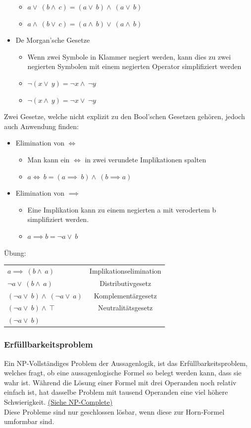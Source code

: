 \documentclass{article}
\begin{document}
\begin{itemize}
\begin{itemize}
				\item{$a \lor\ (b \land\ c) = (a\lor\ b) \land\ (a \lor\ b)$}
				\item{$a \land\ (b \lor\ c) = (a\land\ b) \lor\ (a \land\ b)$}
			\end{itemize}
			\item{De Morgan'sche Gesetze}
			\begin{itemize}
				\item{Wenn zwei Symbole in Klammer negiert werden, kann dies zu zwei negierten Symbolen mit einem negierten Operator simplifiziert werden}
				\item{$\neg (x \lor\ y) = \neg x \land\ \neg y$}
				\item{$\neg (x \land\ y) = \neg x \lor\ \neg y$}
			\end{itemize}
		\end{itemize}
		Zwei Gesetze, welche nicht explizit zu den Bool'schen Gesetzen gehören, jedoch auch Anwendung finden:
		\begin{itemize}
			\item{Elimination von $\iff$ }
			\begin{itemize}
				\item{Man kann ein $\iff$ in zwei verundete Implikationen spalten}
				\item{$a \iff\ b = (a \implies\ b) \land\ (b \implies a)$}
			\end{itemize}
			\item{Elimination von $\implies$}
			\begin{itemize}
				\item{Eine Implikation kann zu einem negierten a mit verodertem b simplifiziert werden.}
				\item{$a \implies b = \neg a \lor\ b$}
			\end{itemize}
		\end{itemize}
		Übung: \\
		\begin{tabular}{lc}
		$a \implies\ (b \land\ a)$ & Implikationselimination \\
		$\neg a \lor\ (b \land\ a)$ & Distributivgesetz \\
		$(\neg a \lor\ b) \land\ (\neg a \lor\ a)$ & Komplementärgesetz \\
		$(\neg a \lor\ b) \land\ \top$ & Neutralitätsgesetz \\
		$(\neg a \lor\ b)$ & \\
		\end{tabular}
		\subsubsection{Erfüllbarkeitsproblem}
		Ein NP-Vollständiges Problem der Aussagenlogik, ist das Erfüllbarkeitsproblem, welches fragt, ob eine aussagenlogische Formel so belegt werden kann, dass sie wahr ist. Während die Lösung einer Formel mit drei Operanden noch relativ einfach ist, hat dasselbe Problem mit tausend Operanden eine viel höhere Schwierigkeit. \hyperref[sec:Komplexität]{\underline{(Siehe NP-Complete)}} \\
		Diese Probleme sind nur geschlossen lösbar, wenn diese zur Horn-Formel umformbar sind.
\end{document}
